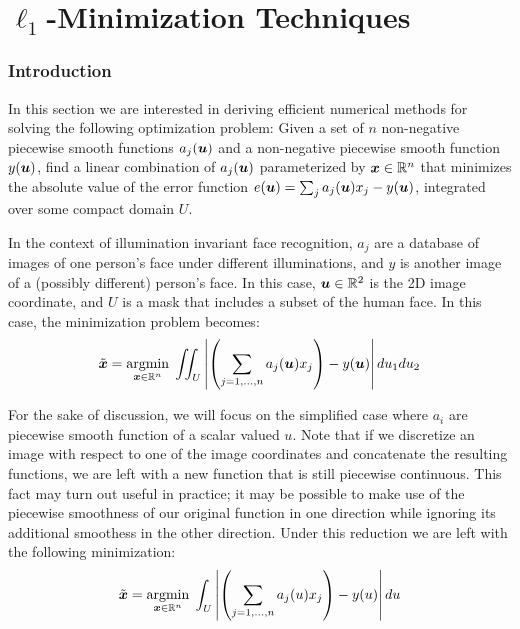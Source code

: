 \chapter{$\ell_1$-Minimization Techniques}
\label{chap:minimization}

%



\subsection{Introduction} 
% 
In this section we are interested in deriving efficient numerical methods
for solving the following optimization problem:  Given a set of $n$
non-negative piecewise smooth functions $a_j(\boldsymbol{u})$ and a non-negative piecewise
smooth function $y(\boldsymbol{u})$,  find a linear combination of $a_j(\boldsymbol{u})$ parameterized
by ${\boldsymbol{x}} \in \mathbb R^n$ that minimizes the absolute value of the error function
$e(\boldsymbol{u}) = \sum_ja_j(\boldsymbol{u}) x_j - y(\boldsymbol{u})$, integrated over some compact domain $U$.

In the context of illumination invariant face recognition, $a_j$ are a database
of images of one person's face under different illuminations, and $y$ is
another image of a (possibly different) person's face.  In this case, $\boldsymbol{u} \in
\mathbb R^2$ is the 2D image coordinate, and $U$ is a mask that includes a subset of
the human face.  In this case, the minimization problem becomes:
\begin{equation}
\label{eqn:continuous2D} 
\tilde{{\boldsymbol{x}}} = {\hbox{$\underset{{\boldsymbol{x}}\in \mathbb R^n}{\mbox{argmin}}\;$}} \iint_U{\left|\left(\sum_{j=1,\ldots,n} a_j(\boldsymbol{u}) x_j\right) - y(\boldsymbol{u})\right| du_1 du_2} 
\end{equation}

For the sake of discussion, we will focus on the simplified case where $a_i$
are piecewise smooth function of a scalar valued $u$.  Note that if we
discretize an image with respect to one of the image coordinates and
concatenate the resulting functions, we are left with a new function that is
still piecewise continuous.  This fact may turn out useful in practice; it may
be possible to make use of the piecewise smoothness of our original function in
one direction while ignoring its additional smoothess in the other direction.
Under this reduction we are left with the following minimization:
\begin{equation}\label{eqn:continuous1D}
\tilde{{\boldsymbol{x}}} = {\hbox{$\underset{{\boldsymbol{x}}\in \mathbb R^n}{\mbox{argmin}}\;$}} \int_U{ \left|\left(\sum_{j=1,\ldots,n} a_j(u) x_j\right) - y(u)\right| du}
\end{equation}

